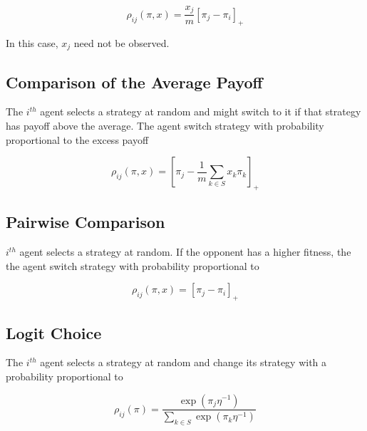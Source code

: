 \documentclass[a4paper,10pt]{article}
\def\th{^{th}}
\begin{document}
\begin{equation}
\rho_{ij}(\pi, x) = \frac{x_j}{m} [\pi_j - \pi_i]_+
\end{equation}

In this case, $x_j$ need not be observed. 


	

\subsection{Comparison of the Average Payoff}

The $i\th$ agent selects a strategy at random and might switch to it if that strategy has payoff above the average. The agent switch strategy with probability proportional to the excess payoff

\begin{equation}
\rho_{ij}(\pi, x) = \left[ \pi_j - \frac{1}{m} \sum_{k\in S} x_k \pi_k \right]_+
\end{equation}



\subsection{Pairwise Comparison}

$i\th$ agent selects a strategy at random. If the opponent has a higher fitness, the the agent switch strategy with probability proportional to

\begin{equation}
\rho_{ij}(\pi, x) = \left[ \pi_j - \pi_i \right]_+
\end{equation}





\subsection{Logit Choice}

The $i\th$ agent selects a strategy at random and change its strategy with a probability proportional to 

\begin{equation}
\rho_{ij}(\pi) = \frac{ \exp(\pi_j \eta^{-1} ) }{ \sum_{k \in S} \exp(\pi_k \eta^{-1} ) }
\end{equation}
\end{document}
